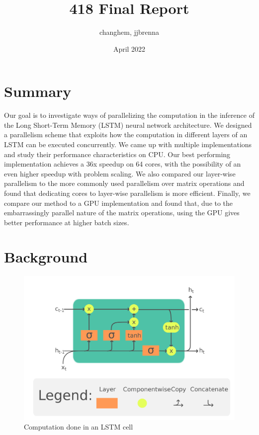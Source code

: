 \documentclass[12pt]{article}
\title{418 Final Report}
\author{changhem, jjbrenna}
\date{April 2022}
\begin{document}
\maketitle

\doublespacing %

\section{Summary}

Our goal is to investigate ways of parallelizing the computation in the inference of the Long Short-Term Memory (LSTM) neural network architecture. %
We designed a parallelism scheme that exploits how the computation in different layers of an LSTM can be executed concurrently.
We came up with multiple implementations and study their performance characteristics on CPU.
Our best performing implementation achieves a 36x speedup on 64 cores, with the possibility of an even higher speedup with problem scaling.
We also compared our layer-wise parallelism to the more commonly used parallelism over matrix operations and found that dedicating cores to layer-wise parallelism is more efficient.
Finally, we compare our method to a GPU implementation and found that, due to the embarrassingly parallel nature of the matrix operations, using the GPU gives better performance at higher batch sizes.

\section{Background}

\begin{figure}
    \centering
    \includegraphics[width=12cm]{LSTM_Cell.png}
    \caption{Computation done in an LSTM cell~\cite{wiki:lstm}}
    \label{fig:lstm_cell}
\end{figure}
\end{document}
